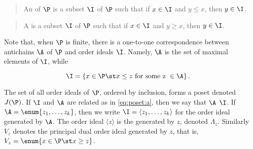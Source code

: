 \begin{quotation}
An  of $\P$ is a subset $\I$ of $\P$ such that if $x \in
\I$ and $y \le x$, then $y \in \I$.
\end{quotation}

\begin{quotation}
A  is a subset $\I$ of $\P$ such that if $x \in \I$
and $y \ge x$, then $y \in \I$.
\end{quotation}

Note that, when $\P$ is finite, there is a one-to-one correspondence between
antichains $\A$ of $\P$ and order ideals $\I$. Namely, $\A$ is the set of maximal
elements of $\I$, while

\begin{equation}
\label{eq:poset:a}
\I = \left\{{x \in \P \st x \le z ~\text{for some z}~ \in \A}\right\}.
\end{equation}

The set of all order ideals of $\P$, ordered by inclusion, forms a poset denoted
$J(\P)$. If $\I$ and $\A$ are related as in \ref{eq:poset:a}, then we say that $\A$
 $\I$. If $\A = \enum{z_1 , \ldots , z_k}$, then we
write $\I = \langle z_1 , \ldots , z_k \rangle$ for the order ideal generated by
$\A$. The order ideal $\langle z \rangle$ is the 
generated by $z$, denoted $\Lambda_z$. Similarly $V_z$ denotes the principal
dual order ideal generated by $z$, that is, $V_z = \enum{x \in \P \st x \ge
z}$.


